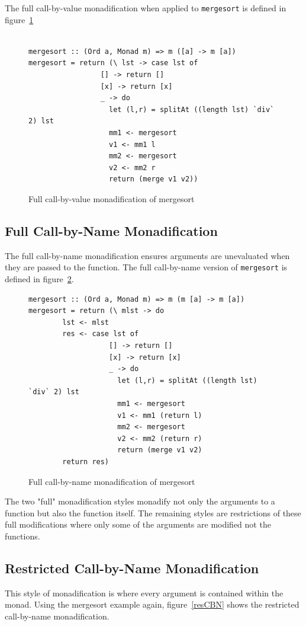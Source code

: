 The full call-by-value monadification when applied to \texttt{mergesort} is defined in figure~\ref{fcbv}

\begin{figure}[t]
\begin{lstlisting}

mergesort :: (Ord a, Monad m) => m ([a] -> m [a])
mergesort = return (\ lst -> case lst of
                 [] -> return []
                 [x] -> return [x]
                 _ -> do
                   let (l,r) = splitAt ((length lst) `div` 2) lst
                   mm1 <- mergesort
                   v1 <- mm1 l
                   mm2 <- mergesort
                   v2 <- mm2 r
                   return (merge v1 v2))					
\end{lstlisting}
\caption{Full call-by-value monadification of mergesort}
\label{fcbv}
\end{figure}

\subsection{Full Call-by-Name Monadification}

The full call-by-name monadification ensures arguments are unevaluated when they are passed to the function. The full call-by-name version of \texttt{mergesort} is defined in figure~\ref{fcbn}.


\begin{figure}[t]
\begin{lstlisting}
mergesort :: (Ord a, Monad m) => m (m [a] -> m [a])
mergesort = return (\ mlst -> do
		lst <- mlst			
		res <- case lst of
                   [] -> return []
                   [x] -> return [x]
                   _ -> do
                     let (l,r) = splitAt ((length lst) `div` 2) lst
                     mm1 <- mergesort
                     v1 <- mm1 (return l)
                     mm2 <- mergesort
                     v2 <- mm2 (return r)
                     return (merge v1 v2)
		return res)					
\end{lstlisting}
\caption{Full call-by-name monadification of mergesort}
\label{fcbn}
\end{figure}

The two "full" monadification styles monadify not only the arguments to a function but also the function itself. The remaining styles are restrictions of these full modifications where only some of the arguments are modified not the functions. 

\subsection{Restricted Call-by-Name Monadification}
This style of monadification is where every argument is contained within the monad. Using the mergesort example again, figure~\ref{resCBN} shows the restricted call-by-name monadification.

